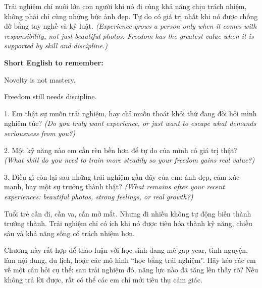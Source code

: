 \begin{baihoc}
Trải nghiệm chỉ nuôi lớn con người khi nó đi cùng khả năng chịu trách nhiệm, không phải chỉ cùng những bức ảnh đẹp. Tự do có giá trị nhất khi nó được chống đỡ bằng tay nghề và kỷ luật.
\textit{(Experience grows a person only when it comes with responsibility, not just beautiful photos. Freedom has the greatest value when it is supported by skill and discipline.)}
\end{baihoc}

\begin{ghinhoanh}
\textbf{Short English to remember:}

Novelty is not mastery.

Freedom still needs discipline.
\end{ghinhoanh}

\begin{tuhocnhanh}
1. Em thật sự muốn trải nghiệm, hay chỉ muốn thoát khỏi thứ đang đòi hỏi mình nghiêm túc? \textit{(Do you truly want experience, or just want to escape what demands seriousness from you?)}

2. Một kỹ năng nào em cần rèn bền hơn để tự do của mình có giá trị thật? \textit{(What skill do you need to train more steadily so your freedom gains real value?)}

3. Điều gì còn lại sau những trải nghiệm gần đây của em: ảnh đẹp, cảm xúc mạnh, hay một sự trưởng thành thật? \textit{(What remains after your recent experiences: beautiful photos, strong feelings, or real growth?)}
\end{tuhocnhanh}

\begin{tongketchuong}
Tuổi trẻ cần đi, cần va, cần mở mắt. Nhưng đi nhiều không tự động biến thành trưởng thành. Trải nghiệm chỉ có ích khi nó được tiêu hóa thành kỹ năng, chiều sâu và khả năng sống có trách nhiệm hơn.
\end{tongketchuong}

\begin{goigiaovien}
Chương này rất hợp để thảo luận với học sinh đang mê gap year, tình nguyện, làm nội dung, du lịch, hoặc các mô hình ``học bằng trải nghiệm''. Hãy kéo các em về một câu hỏi cụ thể: sau trải nghiệm đó, năng lực nào đã tăng lên thấy rõ? Nếu không trả lời được, rất có thể các em chỉ mới tiêu thụ cảm giác.
\end{goigiaovien}

\ngancach